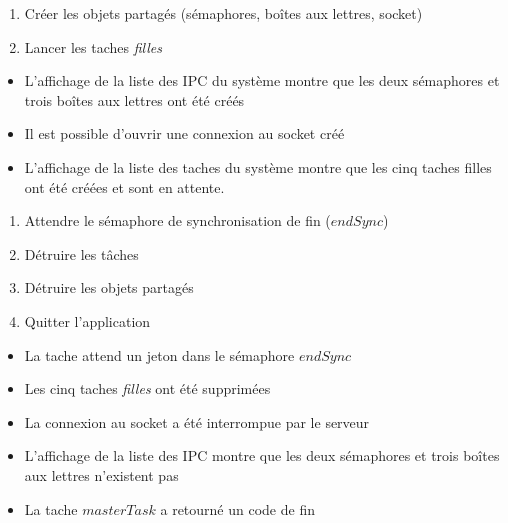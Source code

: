 {
\begin{enumerate}
	\item Créer les objets partagés (sémaphores, boîtes aux lettres, socket)
	\item Lancer les taches \textit{filles}
\end{enumerate}
}
{
\begin{itemize}
	\item L'affichage de la liste des IPC du système montre que les deux
sémaphores et trois boîtes aux lettres ont été créés
	\item Il est possible d'ouvrir une connexion au socket créé
	\item L'affichage de la liste des taches du système montre que les cinq
taches filles ont été créées et sont en attente.
\end{itemize}
}

{
\begin{enumerate}
	\item Attendre le sémaphore de synchronisation de fin ($endSync$)
	\item Détruire les tâches
	\item Détruire les objets partagés
	\item Quitter l'application
\end{enumerate}
}
{
\begin{itemize}
	\item La tache attend un jeton dans le sémaphore $endSync$
	\item Les cinq taches \textit{filles} ont été supprimées
	\item La connexion au socket a été interrompue par le serveur
	\item L'affichage de la liste des IPC montre que les deux sémaphores et
trois boîtes aux lettres n'existent pas
	\item La tache $masterTask$ a retourné un code de fin
\end{itemize}
}
